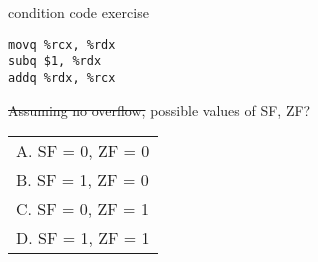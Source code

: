 \begin{frame}[fragile,label=ccExer]{condition code exercise}
\begin{lstlisting}[language=myasm]
movq %rcx, %rdx
subq $1, %rdx
addq %rdx, %rcx
\end{lstlisting}
\sout<2->{Assuming no overflow,} possible values of SF, ZF?
\begin{tabular}{l}
A. SF = 0, ZF = 0 \\
B. SF = 1, ZF = 0 \\
C. SF = 0, ZF = 1 \\
D. SF = 1, ZF = 1 \\
\end{tabular}
\end{frame}
